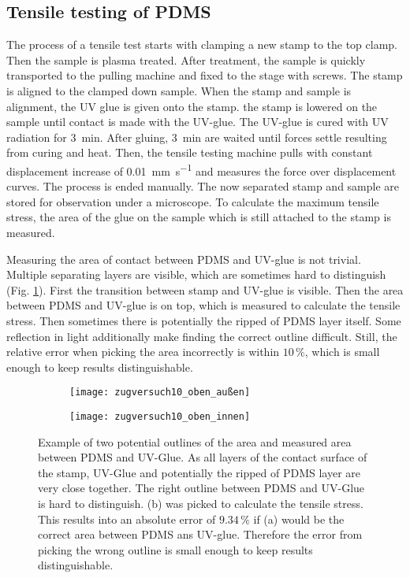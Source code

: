 \subsection{Tensile testing of PDMS}

The process of a tensile test starts with clamping a new stamp to the top clamp. Then the sample is plasma treated. After treatment, the sample is quickly transported to the pulling machine and fixed to the stage with screws. The stamp is aligned to the clamped down sample. When the stamp and sample is alignment, the UV glue is given onto the stamp. the stamp is lowered on the sample until contact is made with the UV-glue. The UV-glue is cured with UV radiation for \SI{3}{\minute}. After gluing, \SI{3}{\minute} are waited until forces settle resulting from curing and heat. Then, the tensile testing machine pulls with constant displacement increase of \SI{0,01}{\milli\meter\per\second} and measures the force over displacement curves. The process is ended manually. The now separated stamp and sample are stored for observation under a microscope. To calculate the maximum tensile stress, the area of the glue on the sample which is still attached to the stamp is measured.

Measuring the area of contact between PDMS and UV-glue is not trivial. Multiple separating layers are visible, which are sometimes hard to distinguish (Fig. \ref{fig:AreaStamp}). First the transition between stamp and UV-glue is visible. Then the area between PDMS and UV-glue is on top, which is measured to calculate the tensile stress. Then sometimes there is potentially the ripped of PDMS layer itself. Some reflection in light additionally make finding the correct outline difficult. Still, the relative error when picking the area incorrectly is within $10\,\%$, which is small enough to keep results distinguishable.

\begin{figure}[hbt!]
	\centering
	\begin{subfigure}[]{0.45\textwidth}
		\centering
		\texttt{[image: zugversuch10\_oben\_außen]}
		\caption{}
	\end{subfigure}
	\begin{subfigure}[]{0.45\textwidth}
		\centering
		\texttt{[image: zugversuch10\_oben\_innen]}
		\caption{}
	\end{subfigure}
	\caption{Example of two potential outlines of the area and measured area between PDMS and UV-Glue. As all layers of the contact surface of the stamp, UV-Glue and potentially the ripped of PDMS layer are very close together. The right outline between PDMS and UV-Glue is hard to distinguish. (b) was picked to calculate the tensile stress. This results into an absolute error of $9.34\,\%$ if (a) would be the correct area between PDMS ans UV-glue. Therefore the error from picking the wrong outline is small enough to keep results distinguishable.}
	\label{fig:AreaStamp}
\end{figure}

